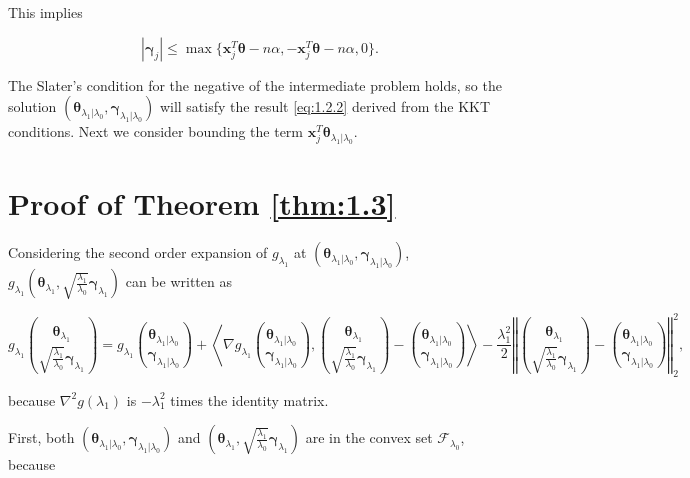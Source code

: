 This implies

\begin{equation}
    \label{eq:1.2.2}
    |\boldsymbol\gamma_j|\leq \max\{\boldsymbol x_j^T\boldsymbol\theta-n\alpha,-\boldsymbol x_j^T\boldsymbol\theta-n\alpha,0\}.
\end{equation}

The Slater's condition for the negative of the intermediate problem holds, so the solution $(\boldsymbol\theta_{\lambda_1|\lambda_0},\boldsymbol\gamma_{\lambda_1|\lambda_0})$ will satisfy the result \eqref{eq:1.2.2} derived from the KKT conditions. Next we consider bounding the term $\boldsymbol x_j^T\boldsymbol\theta_{\lambda_1|\lambda_0}$.

\section{Proof of Theorem \ref{thm:1.3}}

Considering the second order expansion of $g_{\lambda_1}$ at $(\boldsymbol\theta_{\lambda_1|\lambda_0},\boldsymbol\gamma_{\lambda_1|\lambda_0})$, $g_{\lambda_1}\left(\boldsymbol\theta_{\lambda_1},\sqrt{\frac{\lambda_1}{\lambda_0}}\boldsymbol\gamma_{\lambda_1}\right)$ can be written as

\begin{equation}
    \label{eq:1.3.1}
    g_{\lambda_1}\binom{\boldsymbol\theta_{\lambda_1}}{\sqrt{\frac{\lambda_1}{\lambda_0}}\boldsymbol\gamma_{\lambda_1}}=g_{\lambda_1}\binom{\boldsymbol\theta_{\lambda_1|\lambda_0}}{\boldsymbol\gamma_{\lambda_1|\lambda_0}}+\left\langle\nabla g_{\lambda_1}\binom{\boldsymbol\theta_{\lambda_1|\lambda_0}}{\boldsymbol\gamma_{\lambda_1|\lambda_0}},\binom{\boldsymbol\theta_{\lambda_1}}{\sqrt{\frac{\lambda_1}{\lambda_0}}\boldsymbol\gamma_{\lambda_1}}-\binom{\boldsymbol\theta_{\lambda_1|\lambda_0}}{\boldsymbol\gamma_{\lambda_1|\lambda_0}}\right\rangle-\frac{\lambda_1^2}{2}\left\Vert\binom{\boldsymbol\theta_{\lambda_1}}{\sqrt{\frac{\lambda_1}{\lambda_0}}\boldsymbol\gamma_{\lambda_1}}-\binom{\boldsymbol\theta_{\lambda_1|\lambda_0}}{\boldsymbol\gamma_{\lambda_1|\lambda_0}}\right\Vert_2^2,
\end{equation}

because $\nabla^2g(\lambda_1)$ is $-\lambda_1^2$ times the identity matrix. 

First, both $(\boldsymbol\theta_{\lambda_1|\lambda_0},\boldsymbol\gamma_{\lambda_1|\lambda_0})$ and $\left(\boldsymbol\theta_{\lambda_1},\sqrt{\frac{\lambda_1}{\lambda_0}}\boldsymbol\gamma_{\lambda_1}\right)$ are in the convex set $\mathcal{F}_{\lambda_0}$, because

